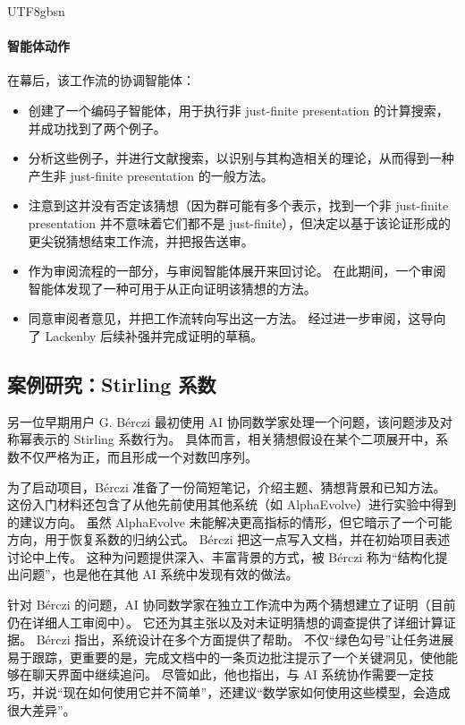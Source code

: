 \documentclass[11pt, a4paper, copyright, gdm]{google}
\begin{document}
\begin{CJK*}{UTF8}{gbsn}
\paragraph{智能体动作}

在幕后，该工作流的协调智能体：
\begin{itemize}
     \item 创建了一个编码子智能体，用于执行非 just-finite presentation 的计算搜索，并成功找到了两个例子。
     \item 分析这些例子，并进行文献搜索，以识别与其构造相关的理论，从而得到一种产生非 just-finite presentation 的一般方法。
     \item 注意到这并没有否定该猜想（因为群可能有多个表示，找到一个非 just-finite presentation 并不意味着它们都不是 just-finite），但决定以基于该论证形成的更尖锐猜想结束工作流，并把报告送审。
     \item 作为审阅流程的一部分，与审阅智能体展开来回讨论。
     在此期间，一个审阅智能体发现了一种可用于从正向证明该猜想的方法。
     \item 同意审阅者意见，并把工作流转向写出这一方法。
     经过进一步审阅，这导向了 Lackenby 后续补强并完成证明的草稿。
\end{itemize}


\subsection{案例研究：Stirling 系数}

另一位早期用户 G. B\'erczi 最初使用 AI 协同数学家处理一个问题，该问题涉及对称幂表示的 Stirling 系数行为。
具体而言，相关猜想假设在某个二项展开中，系数不仅严格为正，而且形成一个对数凹序列。

为了启动项目，B\'erczi 准备了一份简短笔记，介绍主题、猜想背景和已知方法。
这份入门材料还包含了从他先前使用其他系统（如 AlphaEvolve）进行实验中得到的建议方向。
虽然 AlphaEvolve 未能解决更高指标的情形，但它暗示了一个可能方向，用于恢复系数的归纳公式。
B\'erczi 把这一点写入文档，并在初始项目表述讨论中上传。
这种为问题提供深入、丰富背景的方式，被 B\'erczi 称为“结构化提出问题”，也是他在其他 AI 系统中发现有效的做法。

针对 B\'erczi 的问题，AI 协同数学家在独立工作流中为两个猜想建立了证明（目前仍在详细人工审阅中）。
它还为其主张以及对未证明猜想的调查提供了详细计算证据。
B\'erczi 指出，系统设计在多个方面提供了帮助。
不仅“绿色勾号”让任务进展易于跟踪，更重要的是，完成文档中的一条页边批注提示了一个关键洞见，使他能够在聊天界面中继续追问。
尽管如此，他也指出，与 AI 系统协作需要一定技巧，并说“现在如何使用它并不简单”，还建议“数学家如何使用这些模型，会造成很大差异”。


\end{CJK*}
\end{document}
